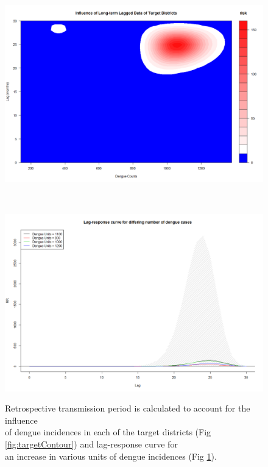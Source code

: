 \documentclass{bmcart}
\begin{document}
\begin{figure}[htbp]
	\centering
	\begin{minipage}{0.8\textwidth}
		\centering
		\includegraphics[width= 1.1\textwidth]{8-LongLagContour}
		\subcaption{}
		\label{fig:targetContour}
	\end{minipage}%
	\\[1.5ex]
	\begin{minipage}{0.8\textwidth}
		\centering
		\includegraphics[width= 1.1\textwidth]{24-LagResposeLongLagMany}
		\subcaption{}
		\label{fig:lagPeak}
	\end{minipage}
	\caption{Retrospective transmission period is calculated to account for the influence \\ of dengue incidences in each of the target districts (Fig \ref{fig:targetContour}) and lag-response curve for \\ an increase in various units of dengue incidences (Fig \ref{fig:lagPeak}).}
\end{figure}
\end{document}
